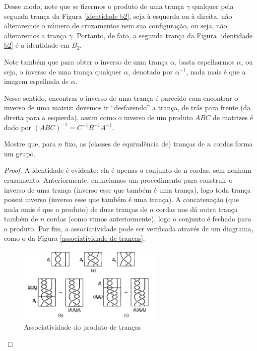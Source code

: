 	\par\vspace{0.3cm} Desse modo, note que se fizermos o produto de uma trança $\gamma$ qualquer pela 
	segunda trança da Figura \eqref{identidade b2}, seja à esquerda ou à direita, não alteraremos o número 
	de cruzamentos nem sua configuração, ou seja, não alteraremos a trança $\gamma$. Portanto, de fato, a 
	segunda trança da Figura \eqref{identidade b2} é a identidade em $B_2$.
	
	\par\vspace{0.3cm} Note também que para obter o inverso de uma trança $\alpha$, basta espelharmos $\alpha$, 
	ou seja, o inverso de uma trança qualquer $\alpha$, denotado por $\alpha^{-1}$, nada mais é que a imagem
	espelhada de $\alpha$.
	\begin{remark}
		Nesse sentido, encontrar o inverso de uma trança é parecido com encontrar o inverso de uma matriz: 
		devemos ir ``desfazendo'' a trança, de trás para frente (da direita para a esquerda), assim como o 
		inverso de um produto $ABC$ de matrizes é dado por $(ABC)^{-1} = C^{-1}B^{-1}A^{-1}$.
	\end{remark}
	\begin{lemma}
	\label{B_n grupo}
		Mostre que, para $n$ fixo, as (classes de equivalência de) tranças de $n$ cordas forma um grupo.
	\end{lemma}
	\begin{proof}
		A identidade é evidente: ela é apenas o conjunto de n cordas, sem nenhum cruzamento. 
		Anteriormente, enunciamos um procedimento para construir o inverso de uma trança 
		(inverso esse que também é uma trança), logo toda trança possui inverso 
		(inverso esse que também é uma trança). A concatenação (que nada mais é que o produto) de duas 
		tranças de $n$ cordas nos dá outra trança também de $n$ cordas (como vimos anteriormente), 
		logo o conjunto é fechado para o produto. Por fim, a associatividade pode ser verificada através 
		de um diagrama, como o da Figura \eqref{associatividade de trancas}.
		\begin{figure}[H]
			\captionsetup{justification=centering}
			\begin{center}
				\includegraphics[width=7.1cm]{Images/associatividade.png}
			\end{center}\caption{Associatividade do produto de tranças}\label{associatividade de trancas}
		\end{figure}
	\end{proof}
